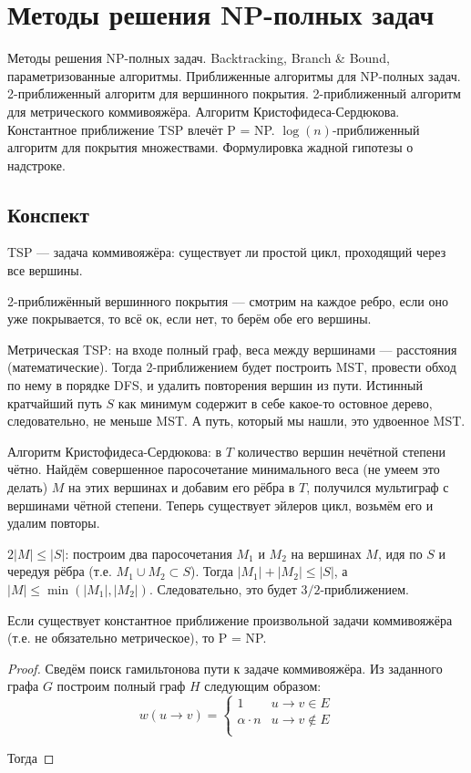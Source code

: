 \section{Методы решения NP-полных задач}
Методы решения NP-полных задач.
Backtracking, Branch \& Bound, параметризованные алгоритмы.
Приближенные алгоритмы для NP-полных задач.
2-приближенный алгоритм для вершинного покрытия.
2-приближенный алгоритм для метрического коммивояжёра.
Алгоритм Кристофидеса-Сердюкова.
Константное приближение TSP влечёт P = NP.
$\log(n)$-приближенный алгоритм для покрытия множествами.
Формулировка жадной гипотезы о надстроке.

\subsection{Конспект}
TSP --- задача коммивояжёра:
существует ли простой цикл,
проходящий через все вершины.

\bigskip

2-приближённый вершинного покрытия
--- смотрим на каждое ребро, если оно уже покрывается,
то всё ок, если нет, то берём обе его вершины.

\bigskip

Метрическая TSP: на входе полный граф,
веса между вершинами --- расстояния (математические).
Тогда 2-приближением будет построить MST,
провести обход по нему в порядке DFS,
и удалить повторения вершин из пути.
Истинный кратчайший путь $S$
как минимум содержит в себе какое-то
остовное дерево, следовательно,
не меньше MST.
А путь, который мы нашли, это удвоенное MST.

\bigskip

Алгоритм Кристофидеса-Сердюкова:
в $T$ количество вершин нечётной степени чётно.
Найдём совершенное паросочетание
минимального веса (не умеем это делать) $M$
на этих вершинах
и добавим его рёбра в $T$,
получился мультиграф с вершинами чётной степени.
Теперь существует эйлеров цикл,
возьмём его и удалим повторы.

$2 |M| \le |S|$:
построим два паросочетания $M_1$ и $M_2$ на вершинах $M$,
идя по $S$ и чередуя рёбра (т.е. $M_1 \cup M_2 \subset S$).
Тогда $|M_1| + |M_2| \le |S|$,
а $|M| \le \min(|M_1|, |M_2|)$.
Следовательно, это будет $3/2$-приближением.

\begin{theorem}
    Если существует константное приближение
    произвольной задачи коммивояжёра
    (т.е. не обязательно метрическое),
    то P = NP.
\end{theorem}
\begin{proof}
    Сведём поиск гамильтонова пути к задаче коммивояжёра.
    Из заданного графа $G$ построим полный граф $H$
    следующим образом:
    \[
        w(u \to v) =
        \begin{cases}
            1 & u \to v \in E \\
            \alpha \cdot n & u \to v \notin E \\
        \end{cases}
    \]

    Тогда
\end{proof}

